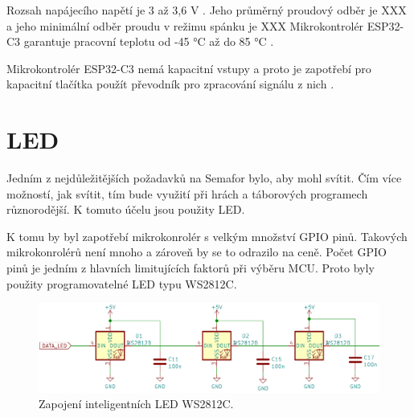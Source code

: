 Rozsah napájecího napětí je 3 až 3,6 V \cite{ESP_C3_dtsh}. Jeho průměrný proudový odběr je XXX a jeho minimální odběr proudu v režimu spánku je XXX %
Mikrokontrolér ESP32-C3 garantuje pracovní teplotu od -45 °C až do 85 °C \cite{ESP_C3_dtsh}.


Mikrokontrolér ESP32-C3 nemá kapacitní vstupy a proto je zapotřebí pro kapacitní tlačítka použít převodník pro zpracování signálu z nich \cite{ESP_C3_dtsh}. 


\section{LED}
Jedním z nejdůležitějších požadavků na Semafor bylo, aby mohl svítit. Čím více možností, jak svítit, tím bude využití 
při hrách a táborových programech různorodější. K tomuto účelu jsou použity LED. 

K tomu by byl zapotřebí mikrokonrolér s velkým množství GPIO pinů. Takových mikrokonrolérů není mnoho a zároveň 
by se to odrazilo na ceně. Počet GPIO pinů je jedním z hlavních limitujících faktorů při výběru MCU. Proto byly použity programovatelné 
LED typu WS2812C.

\begin{figure}[!h]
  \begin{center}
    \includegraphics[scale=0.5]{obrazky/WS2812C.png}
  \end{center}
  \caption[Zapojení inteligentních LED WS2812C]{Zapojení inteligentních LED WS2812C.}
\end{figure}

